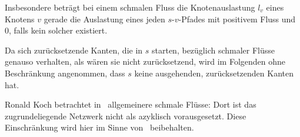 Insbesondere beträgt bei einem schmalen Fluss die Knotenauslastung $l_v$ eines Knotens $v$ gerade die Auslastung eines jeden $s$-$v$-Pfades mit positivem Fluss und $0$, falls kein solcher existiert.

Da sich zurücksetzende Kanten, die in $s$ starten, bezüglich schmaler Flüsse genauso verhalten, als wären sie nicht zurücksetzend, wird im Folgenden ohne Beschränkung angenommen, dass $s$ keine ausgehenden, zurücksetzenden Kanten hat.

\begin{remark}
	Ronald Koch betrachtet in~\cite{Koch2012} allgemeinere schmale Flüsse: Dort ist das zugrundeliegende Netzwerk nicht als azyklisch vorausgesetzt.
	Diese Einschränkung wird hier im Sinne von~\cite{Cominetti2015} beibehalten.
\end{remark}

